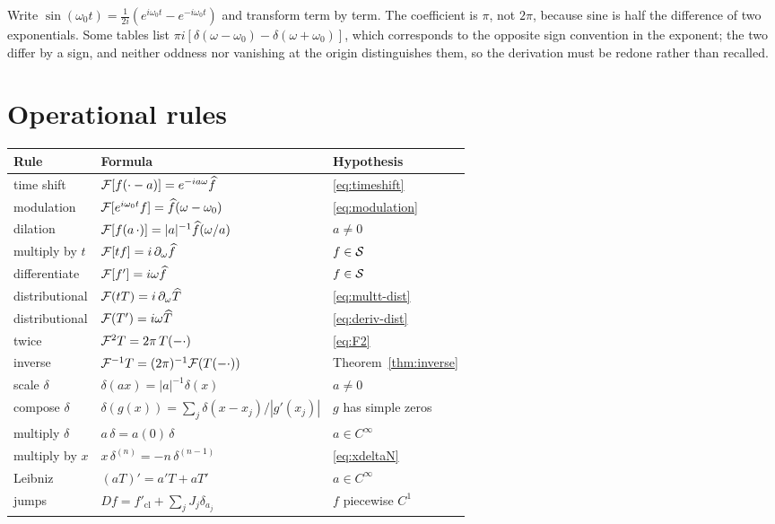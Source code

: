 \begin{remark}
Write $\sin(\omega_{0}t)=\frac{1}{2i}(e^{i\omega_{0}t}-e^{-i\omega_{0}t})$ and transform term by
term. The coefficient is $\pi$, not $2\pi$, because sine is half the difference of two exponentials.
Some tables list $\pi i[\delta(\omega-\omega_{0})-\delta(\omega+\omega_{0})]$, which corresponds to
the opposite sign convention in the exponent; the two differ by a sign, and neither oddness nor
vanishing at the origin distinguishes them, so the derivation must be redone rather than recalled.
\end{remark}

\section{Operational rules}

\begin{center}
\small
\begin{tabular}{@{}lll@{}}
\toprule
Rule & Formula & Hypothesis \\
\midrule
time shift & $\mathcal{F}[f(\cdot-a)]=e^{-ia\omega}\widehat{f}$ & \eqref{eq:timeshift} \\
modulation & $\mathcal{F}[e^{i\omega_{0}t}f]=\widehat{f}(\omega-\omega_{0})$ & \eqref{eq:modulation} \\
dilation & $\mathcal{F}[f(a\,\cdot)]=|a|^{-1}\widehat{f}(\omega/a)$ & $a\neq0$ \\
multiply by $t$ & $\mathcal{F}[tf]=i\,\partial_{\omega}\widehat{f}$ & $f\in\mathcal{S}$ \\
differentiate & $\mathcal{F}[f']=i\omega\widehat{f}$ & $f\in\mathcal{S}$ \\
distributional & $\mathcal{F}(tT)=i\,\partial_{\omega}\widehat T$ & \eqref{eq:multt-dist} \\
distributional & $\mathcal{F}(T')=i\omega\widehat T$ & \eqref{eq:deriv-dist} \\
twice & $\mathcal{F}^{2}T=2\pi\,T(-\cdot)$ & \eqref{eq:F2} \\
inverse & $\mathcal{F}^{-1}T=(2\pi)^{-1}\mathcal{F}(T(-\cdot))$ & Theorem~\ref{thm:inverse} \\
\midrule
scale $\delta$ & $\delta(ax)=|a|^{-1}\delta(x)$ & $a\neq0$ \\
compose $\delta$ & $\delta(g(x))=\sum_{j}\delta(x-x_{j})/|g'(x_{j})|$ & $g$ has simple zeros \\
multiply $\delta$ & $a\,\delta=a(0)\,\delta$ & $a\in C^{\infty}$ \\
multiply by $x$ & $x\,\delta^{(n)}=-n\,\delta^{(n-1)}$ & \eqref{eq:xdeltaN} \\
Leibniz & $(aT)'=a'T+aT'$ & $a\in C^{\infty}$ \\
jumps & $Df=f'_{\mathrm{cl}}+\sum_{j}J_{j}\delta_{a_{j}}$ & $f$ piecewise $C^{1}$ \\
\bottomrule
\end{tabular}
\end{center}

